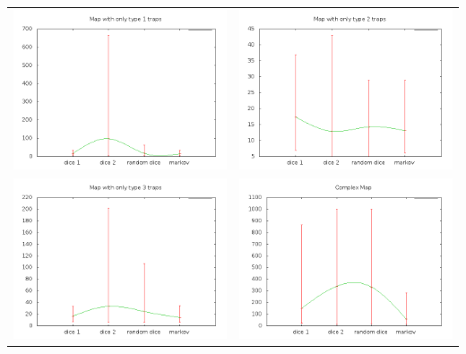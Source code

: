 \documentclass{eplDoc}
\begin{document}
\begin{center}
\begin{tabular}{cc}
    \end{tabular}
    \begin{tabular}{cc}
            \includegraphics[width=9cm]{../map6.png}&
            \includegraphics[width=9cm]{../map7.png}\\
            \includegraphics[width=9cm]{../map8.png}&
            \includegraphics[width=9cm]{../map3.png}\\
    \end{tabular}
\end{center}
\end{document}

